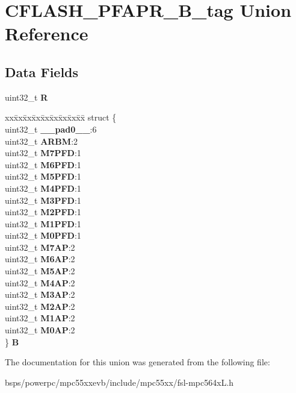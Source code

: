 \hypertarget{unionCFLASH__PFAPR__32B__tag}{}\section{C\+F\+L\+A\+S\+H\+\_\+\+P\+F\+A\+P\+R\+\_\+B\+\_\+tag Union Reference}
\label{unionCFLASH__PFAPR__32B__tag}
\subsection*{Data Fields}
\begin{DoxyCompactItemize}
\item 
\mbox{\label{unionCFLASH__PFAPR__32B__tag_a7d3c517de4a3e5fe2f1cb786274df225}} 
uint32\+\_\+t {\bfseries R}
\item 
\mbox{\label{unionCFLASH__PFAPR__32B__tag_aea49496d2daa689388d41e723b75f190}} 
\begin{tabbing}
xx\=xx\=xx\=xx\=xx\=xx\=xx\=xx\=xx\=\kill
struct \{\\
\>uint32\_t {\bfseries \_\_pad0\_\_}:6\\
\>uint32\_t {\bfseries ARBM}:2\\
\>uint32\_t {\bfseries M7PFD}:1\\
\>uint32\_t {\bfseries M6PFD}:1\\
\>uint32\_t {\bfseries M5PFD}:1\\
\>uint32\_t {\bfseries M4PFD}:1\\
\>uint32\_t {\bfseries M3PFD}:1\\
\>uint32\_t {\bfseries M2PFD}:1\\
\>uint32\_t {\bfseries M1PFD}:1\\
\>uint32\_t {\bfseries M0PFD}:1\\
\>uint32\_t {\bfseries M7AP}:2\\
\>uint32\_t {\bfseries M6AP}:2\\
\>uint32\_t {\bfseries M5AP}:2\\
\>uint32\_t {\bfseries M4AP}:2\\
\>uint32\_t {\bfseries M3AP}:2\\
\>uint32\_t {\bfseries M2AP}:2\\
\>uint32\_t {\bfseries M1AP}:2\\
\>uint32\_t {\bfseries M0AP}:2\\
\} {\bfseries B}\\

\end{tabbing}\end{DoxyCompactItemize}


The documentation for this union was generated from the following file\+:\begin{DoxyCompactItemize}
\item 
bsps/powerpc/mpc55xxevb/include/mpc55xx/fsl-\/mpc564x\+L.\+h\end{DoxyCompactItemize}
